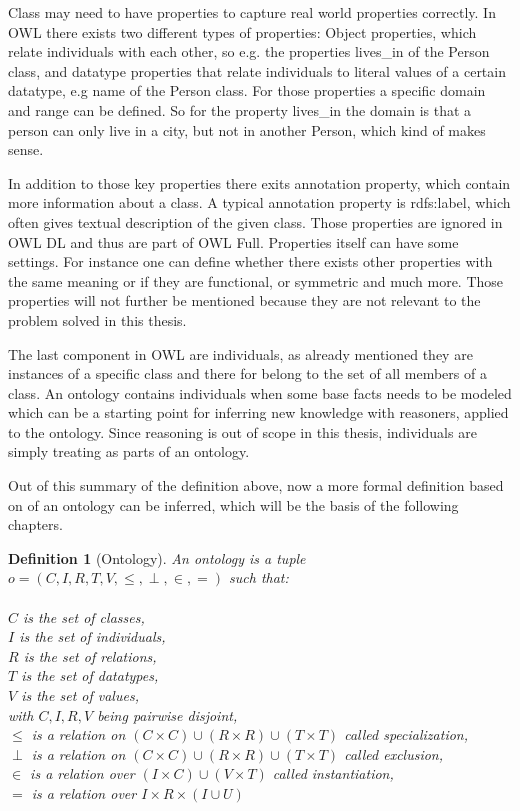 \documentclass[11pt,titlepage,oneside,openany,a4paper]{report}
\newtheorem{definition}{Definition}[chapter]
\begin{document}
Class may need to have properties to capture real world properties correctly. In OWL there exists two different types of properties: Object properties, which relate individuals with each other, so e.g. the properties lives\_in of the Person class, and datatype properties that relate individuals to literal values of a certain datatype, e.g name of the Person class. For those properties a specific domain and range can be defined. So for the property lives\_in the domain is that a person can only live in a city, but not in another Person, which kind of makes sense. 

In addition to those key properties there exits annotation property, which contain more information about a class. A typical annotation property is rdfs:label, which often gives textual description of the given class. Those properties are ignored in OWL DL and thus are part of OWL Full. Properties itself can have some settings. For instance one can define whether there exists other properties with the same meaning or if they are functional, or symmetric and much more. Those properties will not further be mentioned because they are not relevant to the problem solved in this thesis.

The last component in OWL are individuals, as already mentioned they are instances of a specific class and there for belong to the set of all members of a class. An ontology contains individuals when some base facts needs to be modeled which can be a starting point for inferring new knowledge with reasoners, applied to the ontology. Since reasoning is out of scope in this thesis, individuals are simply treating as  parts of an ontology.

Out of this summary of the definition above, now a more formal definition based on \cite{euzenat2013d} of an ontology can be inferred, which will be the basis of the following chapters.
\begin{definition} [Ontology] An ontology is a tuple $ o = ( C,I,R,T,V,\leq,\perp,\in,=)$ such that:\\ \\
$C$ is the set of classes,\\
$I$ is the set of individuals,\\
$R$ is the set of relations,\\
$T$ is the set of datatypes, \\
$V$ is the set of values,\\
with $C,I,R,V$ being pairwise disjoint, \\
$\leq$ is a relation on  $ (C \times C)  \cup (R \times R) \cup (T \times T)$  called specialization,\\
$\perp$ is a relation on  $ (C \times C)  \cup (R \times R) \cup (T \times T)$ called exclusion,\\
$\in$ is a relation over $(I \times C) \cup (V \times T)$ called instantiation,\\
$=$ is a relation over $ I \times R \times (I \cup U)$
\end{definition}
\end{document}

